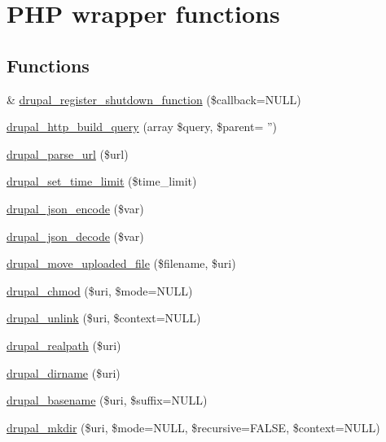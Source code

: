 \hypertarget{group__php__wrappers}{
\section{PHP wrapper functions}
\label{group__php__wrappers}
}
\subsection*{Functions}
\begin{DoxyCompactItemize}
\item 
\& \hyperlink{group__php__wrappers_gac7eaf11b49995f7f539f5c830a65b34f}{drupal\_\-register\_\-shutdown\_\-function} (\$callback=NULL)
\item 
\hyperlink{group__php__wrappers_gada763092b76d70856870eb3afa2ad265}{drupal\_\-http\_\-build\_\-query} (array \$query, \$parent= '')
\item 
\hyperlink{group__php__wrappers_ga77e7930986edc614b20850a0a281609d}{drupal\_\-parse\_\-url} (\$url)
\item 
\hyperlink{group__php__wrappers_ga0507eefd9cd1db602b2184d0fae35097}{drupal\_\-set\_\-time\_\-limit} (\$time\_\-limit)
\item 
\hyperlink{group__php__wrappers_gaf09c80fb758b9f3657772e26817e37b9}{drupal\_\-json\_\-encode} (\$var)
\item 
\hyperlink{group__php__wrappers_gae065f2a8115ef999b74d765c8e7f35ff}{drupal\_\-json\_\-decode} (\$var)
\item 
\hyperlink{group__php__wrappers_gad2a800badd2c93efbff2a2905507e685}{drupal\_\-move\_\-uploaded\_\-file} (\$filename, \$uri)
\item 
\hyperlink{group__php__wrappers_ga5fc93f1c4e81ea4f5b1b32775fca489c}{drupal\_\-chmod} (\$uri, \$mode=NULL)
\item 
\hyperlink{group__php__wrappers_ga533bc32da8860919d20d60ada655e494}{drupal\_\-unlink} (\$uri, \$context=NULL)
\item 
\hyperlink{group__php__wrappers_gafaa5b186c9e78f53b39aae12633eea44}{drupal\_\-realpath} (\$uri)
\item 
\hyperlink{group__php__wrappers_gad00418a5880c03f43e5eccfaa62863f6}{drupal\_\-dirname} (\$uri)
\item 
\hyperlink{group__php__wrappers_ga0125d5e205f50be86146a8df58c2bc5f}{drupal\_\-basename} (\$uri, \$suffix=NULL)
\item 
\hyperlink{group__php__wrappers_ga0cd03adb94eea525f87fb061c9a33340}{drupal\_\-mkdir} (\$uri, \$mode=NULL, \$recursive=FALSE, \$context=NULL)

\end{DoxyCompactItemize}
